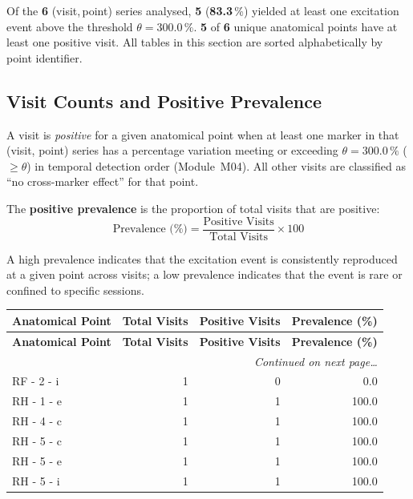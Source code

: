 \documentclass[a4paper,11pt]{article}
\begin{document}
\noindent
Of the \textbf{6} (visit,\,point) series analysed,
\textbf{5} (\textbf{83.3}\,\%) yielded at least one
excitation event above the threshold $\theta = 300.0\,\%$.
\textbf{5} of \textbf{6} unique anatomical points
have at least one positive visit.
All tables in this section are sorted alphabetically by point identifier.

\subsection{Visit Counts and Positive Prevalence}

A visit is \emph{positive} for a given anatomical point when at least one marker in that
(visit, point) series has a percentage variation meeting or exceeding
$\theta = 300.0\,\%$ ($\geq \theta$) in temporal detection order (Module~M04).
All other visits are classified as ``no cross-marker effect'' for that point.

The \textbf{positive prevalence} is the proportion of total visits that are positive:
\[
  \text{Prevalence (\%)} = \frac{\text{Positive Visits}}{\text{Total Visits}} \times 100
\]

A high prevalence indicates that the excitation event is consistently reproduced at a given
point across visits; a low prevalence indicates that the event is rare or confined to
specific sessions.

\begin{small}
\begin{longtable}{p{5cm}rrr}
\toprule
\textbf{Anatomical Point} &
\textbf{Total Visits} &
\textbf{Positive Visits} &
\textbf{Prevalence (\%)} \\
\midrule
\endfirsthead
\toprule
\textbf{Anatomical Point} &
\textbf{Total Visits} &
\textbf{Positive Visits} &
\textbf{Prevalence (\%)} \\
\midrule
\endhead
\midrule
\multicolumn{4}{r}{\small\emph{Continued on next page\ldots}} \\
\endfoot
\bottomrule
\endlastfoot
RF - 2 - i & 1 & 0 & 0.0 \\
RH - 1 - e & 1 & 1 & 100.0 \\
RH - 4 - c & 1 & 1 & 100.0 \\
RH - 5 - c & 1 & 1 & 100.0 \\
RH - 5 - e & 1 & 1 & 100.0 \\
RH - 5 - i & 1 & 1 & 100.0 \\
\end{longtable}
\end{small}
\end{document}
